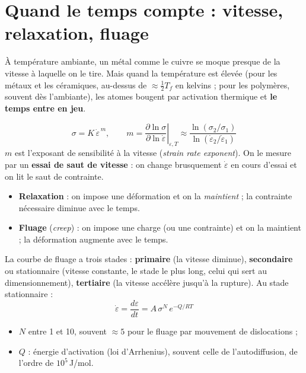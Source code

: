 \section{Quand le temps compte : vitesse, relaxation, fluage}

À température ambiante, un métal comme le cuivre se moque presque de la vitesse à laquelle on
le tire. Mais quand la température est \og élevée\fg{} (pour les métaux et les céramiques,
au-dessus de $\approx \frac12 T_f$ en kelvins ; pour les polymères, souvent dès l'ambiante), les
atomes bougent par activation thermique et \textbf{le temps entre en jeu}.

\begin{defnbox}[title=Sensibilité à la vitesse de déformation]
\[ \sigma = K\,\dot\varepsilon^{\,m}, \qquad
   m = \left.\frac{\partial\ln\sigma}{\partial\ln\dot\varepsilon}\right|_{\varepsilon,T}
   \approx \frac{\ln(\sigma_2/\sigma_1)}{\ln(\dot\varepsilon_2/\dot\varepsilon_1)} \]
$m$ est l'exposant de sensibilité à la vitesse (\emph{strain rate exponent}). On le mesure par
un \textbf{essai de saut de vitesse} : on change brusquement $\dot\varepsilon$ en cours d'essai
et on lit le saut de contrainte.
\end{defnbox}

\begin{defnbox}[title=Relaxation et fluage]
\begin{itemize}
  \item \textbf{Relaxation} : on impose une déformation et on la \emph{maintient} ; la
        contrainte nécessaire diminue avec le temps.
  \item \textbf{Fluage} (\emph{creep}) : on impose une charge (ou une contrainte) et on la
        maintient ; la déformation augmente avec le temps.
\end{itemize}
\end{defnbox}


\begin{thmbox}[title={Loi de fluage stationnaire (à connaître par c\oe ur)}]
La courbe de fluage a trois stades : \textbf{primaire} (la vitesse diminue), \textbf{secondaire}
ou stationnaire (vitesse constante, le stade le plus long, celui qui sert au
dimensionnement), \textbf{tertiaire} (la vitesse accélère jusqu'à la rupture). Au stade
stationnaire :
\[ \dot\varepsilon = \frac{d\varepsilon}{dt} = A\,\sigma^N\,e^{-Q/RT} \]
\begin{itemize}
  \item $N$ entre 1 et 10, souvent $\approx 5$ pour le fluage par mouvement de dislocations ;
  \item $Q$ : énergie d'activation (loi d'Arrhenius), souvent celle de l'autodiffusion,
        de l'ordre de $10^5$\,J/mol.
\end{itemize}
\end{thmbox}

